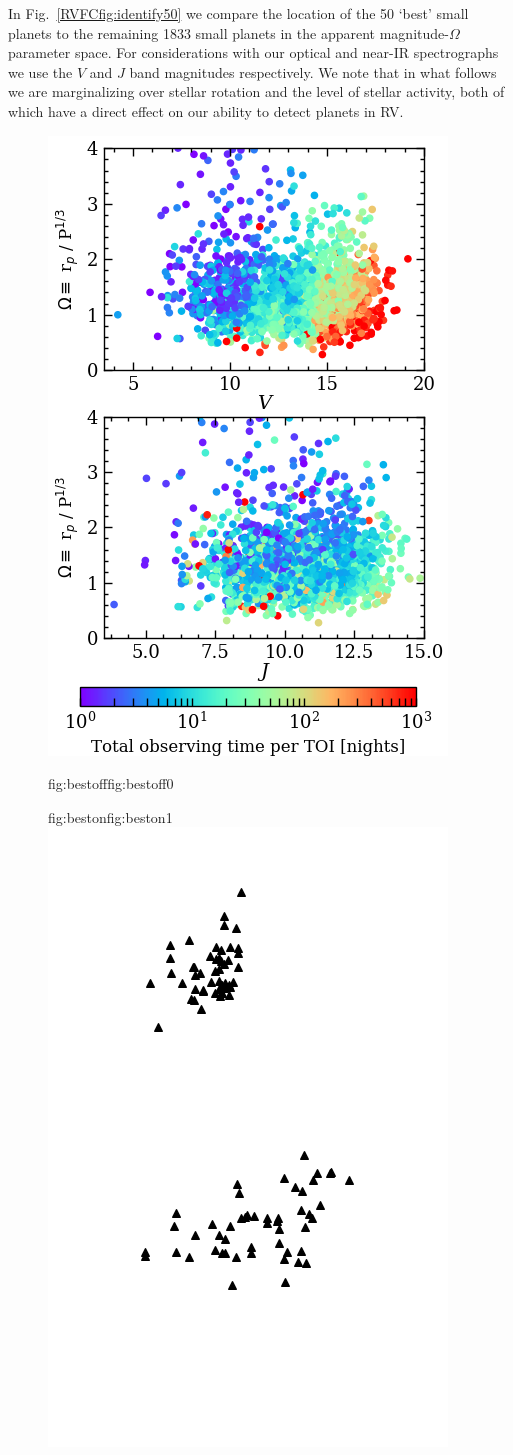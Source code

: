 In Fig.~\ref{RVFCfig:identify50} we compare the location of the 50 `best' small planets to the remaining
1833 small planets in the apparent magnitude-$\Omega$ parameter space. For considerations with our
optical and near-IR spectrographs we use the $V$ and $J$ band magnitudes respectively.
We note that in what follows we are marginalizing over stellar rotation and the level of stellar activity, both of
which have a direct effect on our ability to detect planets in RV. \\

\begin{figure}
  \centering
  \includegraphics[width=0.6\hsize]{figures/identify50_bkgd.png}%
  \hspace{-0.6\hsize}%
  \begin{ocg}{fig:bestoff}{fig:bestoff}{0}%
  \end{ocg}%
  \begin{ocg}{fig:beston}{fig:beston}{1}%
  \includegraphics[width=0.6\hsize]{figures/identify50_best.png}%

\end{ocg}
\end{figure}
